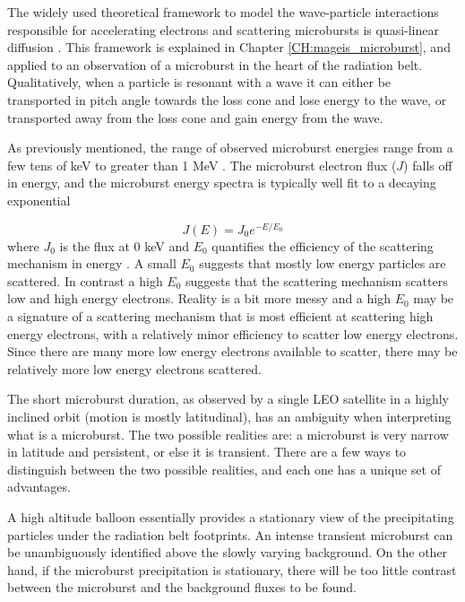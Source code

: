 The widely used theoretical framework to model the wave-particle interactions responsible for accelerating electrons and scattering microbursts is quasi-linear diffusion \citep[e.g.][]{Walker1993, Summers1998, Meredith2002, Horne2005, Thorne2005, Summers2005}. This framework is explained in Chapter \ref{CH:mageis_microburst}, and applied to an observation of a microburst in the heart of the radiation belt. Qualitatively, when a particle is resonant with a wave it can either be transported in pitch angle towards the loss cone and lose energy to the wave, or transported away from the loss cone and gain energy from the wave.

As previously mentioned, the range of observed microburst energies range from a few tens of keV \citep[e.g][]{Datta1997, Parks1967} to greater than 1 MeV \citep[e.g.][]{Blake1996, Greeley2019}. The microburst electron flux ($J$) falls off in energy, and the microburst energy spectra is typically well fit to a decaying exponential 

\begin{equation}
J(E) = J_0 e^{-E/E_0}
\end{equation} where $J_0$ is the flux at 0 keV and $E_0$ quantifies the efficiency of the scattering mechanism in energy \citep[e.g.][]{Parks1967, Datta1997, Lee2005}. A small $E_0$ suggests that mostly low energy particles are scattered. In contrast a high $E_0$ suggests that the scattering mechanism scatters low and high energy electrons. Reality is a bit more messy and a high $E_0$ may be a signature of a scattering mechanism that is most efficient at scattering high energy electrons, with a relatively minor efficiency to scatter low energy electrons. Since there are many more low energy electrons available to scatter, there may be relatively more low energy electrons scattered.

The short microburst duration, as observed by a single LEO satellite in a highly inclined orbit (motion is mostly latitudinal), has an ambiguity when interpreting what is a microburst. The two possible realities are: a microburst is very narrow in latitude and persistent, or else it is transient. There are a few ways to distinguish between the two possible realities, and each one has a unique set of advantages.

A high altitude balloon essentially provides a stationary view of the precipitating particles under the radiation belt footprints. An intense transient microburst can be unambiguously identified above the slowly varying background. On the other hand, if the microburst precipitation is stationary, there will be too little contrast between the microburst and the background fluxes to be found.

